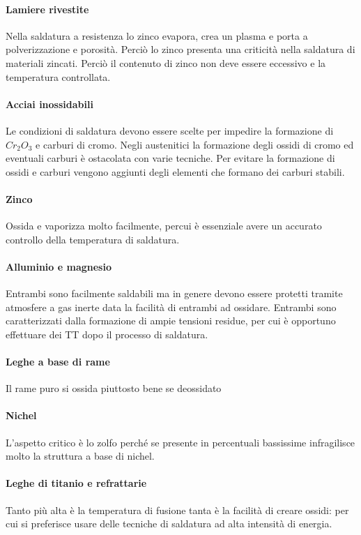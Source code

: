 \paragraph{Lamiere rivestite}
Nella saldatura a resistenza lo zinco evapora, crea un plasma e porta a polverizzazione e porosità.
Perciò lo zinco presenta una criticità nella saldatura di materiali zincati. Perciò il contenuto di zinco non deve essere eccessivo e la temperatura controllata.
\paragraph{Acciai inossidabili}
Le condizioni di saldatura devono essere scelte per impedire la formazione di $Cr_2O_3$ e carburi di cromo.
Negli austenitici la formazione degli ossidi di cromo ed eventuali carburi è ostacolata con varie tecniche.
Per evitare la formazione di ossidi e carburi vengono aggiunti degli elementi che formano dei carburi stabili.
\paragraph{Zinco} Ossida e vaporizza molto facilmente, percui è essenziale avere un accurato controllo della temperatura di saldatura.
\paragraph{Alluminio e magnesio} Entrambi sono facilmente saldabili ma in genere devono essere protetti tramite atmosfere a gas inerte data la facilità di entrambi ad ossidare. Entrambi sono caratterizzati dalla formazione di ampie tensioni residue, per cui è opportuno effettuare dei \ac{TT} dopo il processo di saldatura.
\paragraph{Leghe a base di rame} Il rame puro si ossida piuttosto bene se deossidato
\paragraph{Nichel} L'aspetto critico è lo zolfo perché se presente in percentuali bassissime infragilisce molto la struttura a base di nichel.
\paragraph{Leghe di titanio e refrattarie} Tanto più alta è la temperatura di fusione tanta è la facilità di creare ossidi: per cui si preferisce usare delle tecniche di saldatura ad alta intensità di energia.

